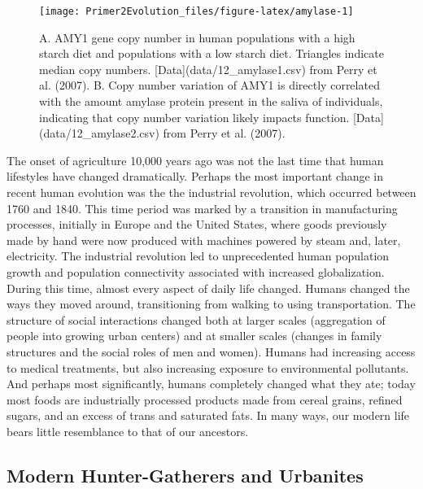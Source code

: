 \documentclass[
]{book}
\begin{document}
\begin{figure}
\texttt{[image: Primer2Evolution\_files/figure-latex/amylase-1]} \caption{A. AMY1 gene copy number in human populations with a high starch diet and populations with a low starch diet. Triangles indicate median copy numbers. [Data](data/12_amylase1.csv) from Perry et al. (2007). B. Copy number variation of AMY1 is directly correlated with the amount amylase protein present in the saliva of individuals, indicating that copy number variation likely impacts function. [Data](data/12_amylase2.csv) from Perry et al. (2007).}\label{fig:amylase}
\end{figure}

The onset of agriculture 10,000 years ago was not the last time that human lifestyles have changed dramatically. Perhaps the most important change in recent human evolution was the the industrial revolution, which occurred between 1760 and 1840. This time period was marked by a transition in manufacturing processes, initially in Europe and the United States, where goods previously made by hand were now produced with machines powered by steam and, later, electricity. The industrial revolution led to unprecedented human population growth and population connectivity associated with increased globalization. During this time, almost every aspect of daily life changed. Humans changed the ways they moved around, transitioning from walking to using transportation. The structure of social interactions changed both at larger scales (aggregation of people into growing urban centers) and at smaller scales (changes in family structures and the social roles of men and women). Humans had increasing access to medical treatments, but also increasing exposure to environmental pollutants. And perhaps most significantly, humans completely changed what they ate; today most foods are industrially processed products made from cereal grains, refined sugars, and an excess of trans and saturated fats. In many ways, our modern life bears little resemblance to that of our ancestors.

\hypertarget{modern-hunter-gatherers-and-urbanites}{%
\subsection{Modern Hunter-Gatherers and Urbanites}\label{modern-hunter-gatherers-and-urbanites}}
\end{document}
